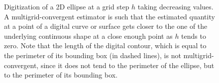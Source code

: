 \begin{figure}[htbp]
  \centering
  \hspace{0.05\textwidth}
  \hspace{0.05\textwidth}
  \caption{Digitization of a 2D ellipse at a grid step $h$ taking decreasing values.
    A multigrid-convergent estimator is such that the estimated quantity at a point of a
    digital curve or surface gets closer to the one of the underlying continuous shape
    at a close enough point as $h$ tends to zero. Note that the length of the digital
    contour, which is equal to the perimeter of its bounding box (in dashed lines),
    is not multigrid-convergent, since it does not tend to the perimeter of the ellipse,
    but to the perimeter of its bounding box.}
  \label{fig:multi}
\end{figure}






